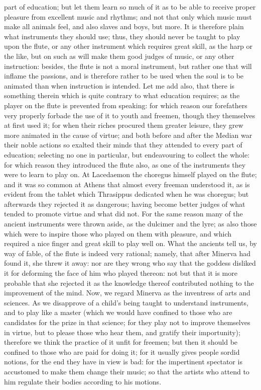 part of education; but let them learn so much of it as to be able to
receive proper pleasure from excellent music and rhythms; and not that
only which music must make all animals feel, and also slaves and boys, but
more. It is therefore plain what instruments they should use; thus, they
should never be taught to play upon the flute, or any other instrument
which requires great skill, as the harp or the like, but on such as will
make them good judges of music, or any other instruction: besides, the
flute is not a moral instrument, but rather one that will inflame the
passions, and is therefore rather to be used when the soul is to be
animated than when instruction is intended. Let me add also, that there is
something therein which is quite contrary to what education requires; as
the player on the flute is prevented from speaking: for which reason our
forefathers very properly forbade the use of it to youth and freemen,
though they themselves at first used it; for when their riches procured
them greater leisure, they grew more animated in the cause of virtue; and
both before and after the Median war their noble actions so exalted their
minds that they attended to every part of education; selecting no one in
particular, but endeavouring to collect the whole: for which reason they
introduced the flute also, as one of the instruments they were to learn to
play on. At Lacedaemon the choregus himself played on the flute; and it
was so common at Athens that almost every freeman understood it, as is
evident from the tablet which Thrasippus dedicated when he was choregus;
but afterwards they rejected it as dangerous; having become better judges
of what tended to promote virtue and what did not. For the same reason
many of the ancient instruments were thrown aside, as the dulcimer and the
lyre; as also those which were to inspire those who played on them with
pleasure, and which required a nice finger and great skill to play well
on. What the ancients tell us, by way of fable, of the flute is indeed
very rational; namely, that after Minerva had found it, she threw it away:
nor are they wrong who say that the goddess disliked it for deforming the
face of him who played thereon: not but that it is more probable that she
rejected it as the knowledge thereof contributed nothing to the
improvement of the mind. Now, we regard Minerva as the inventress of arts
and sciences. As we disapprove of a child's being taught to understand
instruments, and to play like a master (which we would have confined to
those who are candidates for the prize in that science; for they play not
to improve themselves in virtue, but to please those who hear them, and
gratify their importunity); therefore we think the practice of it unfit
for freemen; but then it should be confined to those who are paid for
doing it; for it usually gives people sordid notions, for the end they
have in view is bad: for the impertinent spectator is accustomed to make
them change their music; so that the artists who attend to him regulate
their bodies according to his motions.

